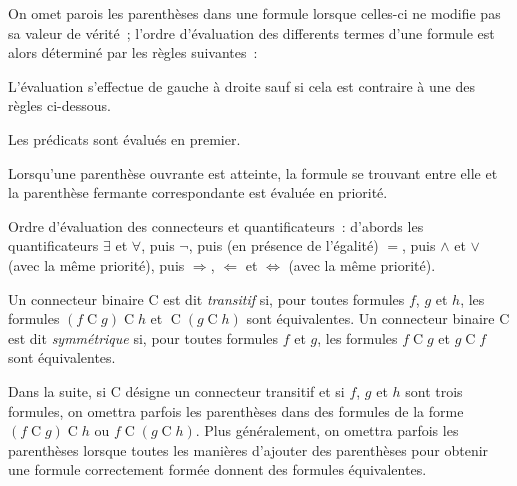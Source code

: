 On omet parois les parenthèses dans une formule lorsque celles-ci ne modifie pas sa valeur de vérité ; l'ordre d'évaluation des differents termes d'une formule est alors déterminé par les règles suivantes : 
\startitemize
  \item L'évaluation s'effectue de gauche à droite sauf si cela est contraire à une des règles ci-dessous.
  \item Les prédicats sont évalués en premier.
  \item Lorsqu'une parenthèse ouvrante est atteinte, la formule se trouvant entre elle et la parenthèse fermante correspondante est évaluée en priorité.
  \item Ordre d'évaluation des connecteurs et quantificateurs : d'abords les quantificateurs $\exists$ et $\forall$, puis $\lnot$, puis (en présence de l'égalité) $=$, puis $\wedge$ et $\vee$ (avec la même priorité), puis $\Rightarrow$, $\Leftarrow$ et $\Leftrightarrow$ (avec la même priorité).
\stopitemize

Un connecteur binaire $\mathrm{C}$ est dit \emph{transitif} si, pour toutes formules $f$, $g$ et $h$, les formules $(f \mathop{\mathrm{C}} g) \mathop{\mathrm{C}} h$ et $\mathop{\mathrm{C}} (g \mathop{\mathrm{C}} h)$ sont équivalentes.
Un connecteur binaire $\mathrm{C}$ est dit \emph{symmétrique} si, pour toutes formules $f$ et $g$, les formules $f \mathop{\mathrm{C}} g$ et $g \mathop{\mathrm{C}} f$ sont équivalentes.

Dans la suite, si $\mathrm{C}$ désigne un connecteur transitif et si $f$, $g$ et $h$ sont trois formules, on omettra parfois les parenthèses dans des formules de la forme $(f \mathop{\mathrm{C}} g) \mathop{\mathrm{C}} h$ ou $f \mathop{\mathrm{C}} (g \mathop{\mathrm{C}} h)$. 
Plus généralement, on omettra parfois les parenthèses lorsque toutes les manières d'ajouter des parenthèses pour obtenir une formule correctement formée donnent des formules équivalentes.

